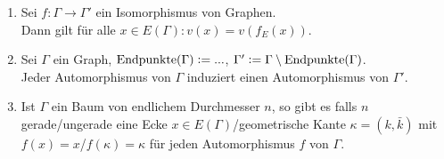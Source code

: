 \documentclass[a4paper, 10pt]{report}
\begin{document}
\begin{Prop}
\begin{enumerate}
  \item Sei $f: \Gamma \to \Gamma'$ ein Isomorphismus von Graphen.\\
  Dann gilt für alle $x \in E(\Gamma): v(x) = v(f_E(x))$.
  \item Sei $\Gamma$ ein Graph, $\textrm{Endpunkte}(\Gamma) \mathrel{\mathop:}= ...$,
  $\Gamma' \mathrel{\mathop:}= \Gamma \setminus \textrm{Endpunkte}(\Gamma)$.\\
  Jeder Automorphismus von $\Gamma$ induziert einen Automorphismus von
  $\Gamma'$.
  \item Ist $\Gamma$ ein Baum von endlichem Durchmesser $n$, so gibt es falls
  $n$ gerade/ungerade eine Ecke $x \in E(\Gamma)$/geometrische Kante $\kappa =
  (k, \bar{k})$ mit $f(x) = x$/$f(\kappa) = \kappa$ für jeden Automorphismus $f$
  von $\Gamma$.
  
  
\end{enumerate}
\end{Prop}
\end{document}

